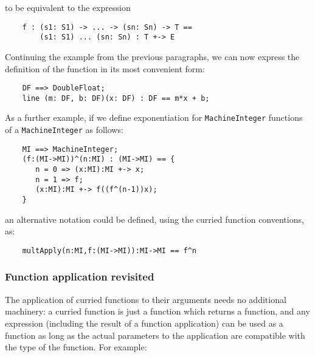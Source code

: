 to be equivalent to the expression

\begin{small}
\begin{verbatim}
    f : (s1: S1) -> ... -> (sn: Sn) -> T ==
        (s1: S1) ... (sn: Sn) : T +-> E
\end{verbatim}
\end{small}

Continuing the example from the previous paragraphs, we can now express
the definition of the function  in its most convenient form:

\begin{small}
\begin{verbatim}
    DF ==> DoubleFloat;
    line (m: DF, b: DF)(x: DF) : DF == m*x + b;
\end{verbatim}
\end{small}

As a further example, if we define exponentiation%
 for {\tt MachineInteger} functions 
of a {\tt MachineInteger} as follows:

\begin{small}
\begin{verbatim}
    MI ==> MachineInteger;
    (f:(MI->MI))^(n:MI) : (MI->MI) == {
       n = 0 => (x:MI):MI +-> x;
       n = 1 => f;
       (x:MI):MI +-> f((f^(n-1))x);
    }
\end{verbatim}
\end{small}

an alternative notation could be defined, using the curried function
conventions, as:

\begin{small}
\begin{verbatim}
    multApply(n:MI,f:(MI->MI)):MI->MI == f^n
\end{verbatim}
\end{small}

\subsubsection{Function application revisited}

The application of curried functions to their arguments needs no additional
machinery:  a curried function is just a function which returns a function,
and any expression (including the result of a function application) can be
used as a function as long as the actual parameters to the application are
compatible with the type of the function.  For example:

